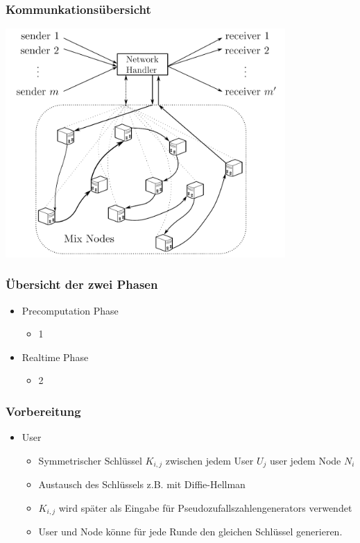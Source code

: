 \documentclass[t, xcolor=dvipsnames]{beamer}
\begin{document}
\begin{frame}
	\frametitle{Kommunkationsübersicht}
	\begin{center}
				\includegraphics [width=0.8\textwidth]{pic/commover.png}
			\end{center}
	\vspace{\fill}
\end{frame}




\begin{frame}
	\frametitle{Übersicht der zwei Phasen}
	\begin{itemize}
		\item Precomputation Phase
			\begin{itemize}
				\item 1
			\end{itemize}
		\item Realtime Phase
			\begin{itemize}
				\item 2
			\end{itemize}
	\end{itemize}
	\vspace{\fill}
\end{frame}


\begin{frame}
	\frametitle{Vorbereitung}
	\begin{itemize}
		\item User
			\begin{itemize}
				\item Symmetrischer Schlüssel $K_{i,j}$ zwischen jedem User $U_j$ user jedem Node $N_i$ 
				\item Austausch des Schlüssels z.B. mit Diffie-Hellman
				\item $K_{i,j}$ wird später als Eingabe für Pseudozufallszahlengenerators verwendet
				\item User und Node könne für jede Runde den gleichen Schlüssel generieren.
			\end{itemize}
	\end{itemize}
	\vspace{\fill}
\end{frame}
\end{document}
